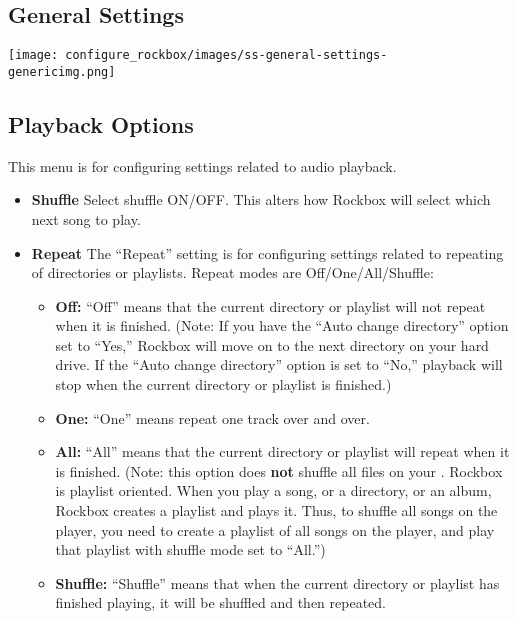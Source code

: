 \begin{itemize}
  \section{\label{ref:GeneralSettings}General Settings}
  \begin{center}
    \texttt{[image: configure\_rockbox/images/ss-general-settings-\\genericimg.png]}
  \end{center}
  
  \subsection{\label{ref:PlaybackOptions}Playback Options}
  This menu is for configuring settings related to audio playback.
  
  \begin{itemize}
  \item \textbf{Shuffle}
    Select shuffle ON/OFF. This alters how Rockbox will select which next song to play.
  \item \textbf{Repeat}
    The ``Repeat'' setting is for configuring settings related to repeating of directories or playlists.  Repeat modes are Off/One/All/Shuffle: 
    \begin{itemize}
    \item \textbf{Off:  }``Off'' means that the current directory or playlist will not repeat when it is finished.  (Note:  If you have the ``Auto change directory'' option set to ``Yes,'' Rockbox will move on to the next directory on your hard drive.  If the ``Auto change directory'' option is set to ``No,'' playback will stop when the current directory or playlist is finished.)
    \item\textbf{One:  }``One'' means repeat one track over and over.
    \item\textbf{All:  } ``All'' means that the current directory or playlist will repeat when it is finished.  (Note:  this option does \textbf{not} shuffle all files on your \dap.  Rockbox is playlist oriented. When you play a song, or a directory, or an album, Rockbox creates a playlist and plays it. Thus, to shuffle all songs on the player, you need to create a playlist of all songs on the player, and play that playlist with shuffle mode set to ``All.'')
    \item\textbf{Shuffle:  }``Shuffle'' means that when the current directory or playlist has finished playing, it will be shuffled and then repeated.
    \end{itemize}
    

\end{itemize}
\end{itemize}
